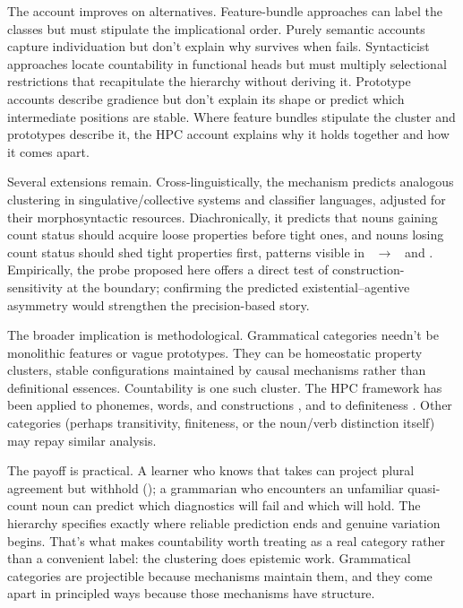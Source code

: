 \documentclass[12pt,a4paper]{article}
\begin{document}
The account improves on alternatives. Feature-bundle approaches can label the classes but must stipulate the implicational order. Purely semantic accounts capture individuation but don't explain why  survives when  fails. Syntacticist approaches locate countability in functional heads but must multiply selectional restrictions that recapitulate the hierarchy without deriving it. Prototype accounts describe gradience but don't explain its shape or predict which intermediate positions are stable. Where feature bundles stipulate the cluster and prototypes describe it, the HPC account explains why it holds together and how it comes apart.

Several extensions remain. Cross-linguistically, the mechanism predicts analogous clustering in singulative/collective systems and classifier languages, adjusted for their morphosyntactic resources. Diachronically, it predicts that nouns gaining count status should acquire loose properties before tight ones, and nouns losing count status should shed tight properties first, patterns visible in ~$\to$~ and . Empirically, the  probe proposed here offers a direct test of construction-sensitivity at the boundary; confirming the predicted existential--agentive asymmetry would strengthen the precision-based story.

The broader implication is methodological. Grammatical categories needn't be monolithic features or vague prototypes. They can be homeostatic property clusters, stable configurations maintained by causal mechanisms rather than definitional essences. Countability is one such cluster. The HPC framework has been applied to phonemes, words, and constructions \citep{reynolds2025stack}, and to definiteness \citep{reynolds2025definiteness}. Other categories (perhaps transitivity, finiteness, or the noun/verb distinction itself) may repay similar analysis.

The payoff is practical. A learner who knows that  takes  can project plural agreement but withhold (); a grammarian who encounters an unfamiliar quasi-count noun can predict which diagnostics will fail and which will hold. The hierarchy specifies exactly where reliable prediction ends and genuine variation begins. That's what makes countability worth treating as a real category rather than a convenient label: the clustering does epistemic work. Grammatical categories are projectible because mechanisms maintain them, and they come apart in principled ways because those mechanisms have structure.
\end{document}
